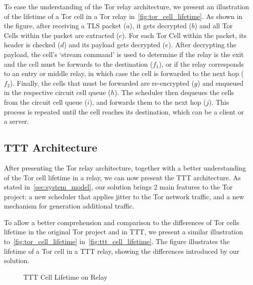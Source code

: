 To ease the understanding of the Tor relay architecture, we present an  illustration of the lifetime of a Tor cell in a Tor relay in~\autoref{fig:tor_cell_lifetime}. As shown in the figure, after receiving a TLS packet (\(a\)), it gets decrypted (\(b\)) and all Tor Cells within the packet are extracted (\(c\)). For each Tor Cell within the packet, its header is checked (\(d\))  and its payload gets decrypted (\(e\)). After decrypting the payload, the cell's `stream command' is used to determine if the relay is the exit and the cell must be forwards to the destination (\(f_1\)), or if the relay corresponds to an entry or middle relay, in which case the cell is forwarded to the next hop (\(f_2\)). Finally, the cells that must be forwarded are re-encrypted (\(g\)) and enqueued in the respective circuit cell queue (\(h\)). The scheduler then dequeues the cells from the circuit cell queue (\(i\)), and forwards them to the next hop (\(j\)). This process is repeated until the cell reaches its destination, which can be a client or a server. 


\subsection{TTT Architecture}\label{sec:ttt_architecture}

After presenting the Tor relay architecture, together with a better understanding of the Tor cell lifetime in a relay, we can now present the TTT architecture. As stated in~\autoref{sec:system_model}, our solution brings 2 main features to the Tor project: a new scheduler that applies jitter to the Tor network traffic, and a new mechanism for generation additional traffic.

To allow a better comprehension and comparison to the differences of Tor cells lifetime in the original Tor project and in TTT, we present a similar illustration to~\autoref{fig:tor_cell_lifetime} in~\autoref{fig:ttt_cell_lifetime}. The figure illustrates the lifetime of a Tor cell in a TTT relay, showing the differences introduced by our solution.
\begin{figure}[!h]
  \centering
  \caption{TTT Cell Lifetime on Relay}\label{fig:ttt_cell_lifetime}
\end{figure}

